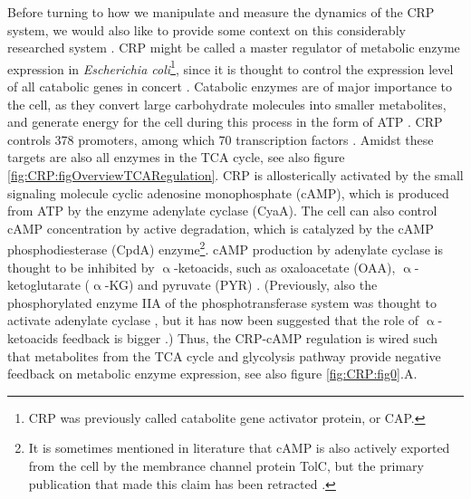 Before turning to how we manipulate and measure the dynamics of the CRP system, 
we would also like to provide some context on this considerably researched system \cite{Keseler2017, Fic2009, Deutscher2008, Gorke2008}.
%
%
CRP might be called a master regulator of metabolic enzyme expression in \textit{Escherichia coli}\footnote{CRP was previously called catabolite gene activator protein, or CAP.}, since
%
it is thought to %
control the expression level of all catabolic genes in concert \cite{You2013, Hui2015, Kochanowski2017}.
%
Catabolic enzymes 
are of major importance to the cell, 
as they
convert large carbohydrate molecules into smaller metabolites, and generate energy for the cell during this process in the form of ATP \cite{Nelson2005}.
%
CRP controls 378 promoters, among which 70 transcription factors \cite{Green2014, Shimada2011, Grainger2005, Zheng2004}.
%
Amidst these targets are also all enzymes in the TCA cycle, see also figure \ref{fig:CRP:figOverviewTCARegulation}.
%
CRP is allosterically activated by the small signaling molecule cyclic adenosine monophosphate (cAMP), 
which is produced from ATP by the enzyme adenylate cyclase (CyaA).
%
The cell can also control cAMP concentration by active degradation, 
which is catalyzed by the 
cAMP phosphodiesterase (CpdA) enzyme\footnote{It is sometimes mentioned in literature that cAMP is also actively exported from the cell by the membrance channel protein TolC, but the primary publication that made this claim has been retracted \cite{Hantke2011}.}.
%
cAMP production by adenylate cyclase is thought to be inhibited by $\upalpha$-ketoacids, such as oxaloacetate (OAA), $\upalpha$-ketoglutarate ($\upalpha$-KG) and pyruvate (PYR) \cite{You2013}.
(Previously, also the phosphorylated enzyme IIA of the phosphotransferase system was thought to activate adenylate cyclase \cite{Keseler2017, Deutscher2008, Gorke2008}, but it has now been suggested that the role of $\upalpha$-ketoacids feedback is bigger \cite{You2013}.)
%
Thus, the CRP-cAMP regulation is wired such that metabolites from the TCA cycle and glycolysis pathway provide negative feedback on metabolic enzyme expression, see also figure \ref{fig:CRP:fig0}.A. 
